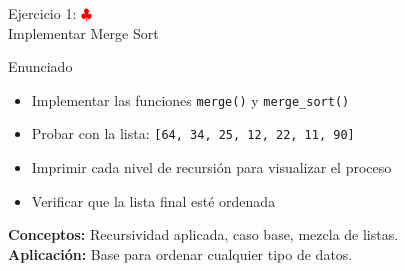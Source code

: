 \documentclass[10pt]{beamer}
\begin{document}
\begin{frame}{Ejercicio 1: \hfill \textcolor{red}{$\clubsuit$} \\ Implementar Merge Sort}
  \begin{block}{Enunciado}
    \begin{itemize}
      \item Implementar las funciones \texttt{merge()} y \texttt{merge\_sort()}
      \item Probar con la lista: \texttt{[64, 34, 25, 12, 22, 11, 90]}
      \item Imprimir cada nivel de recursión para visualizar el proceso
      \item Verificar que la lista final esté ordenada
    \end{itemize}
  \end{block}
  
  \textbf{Conceptos:} Recursividad aplicada, caso base, mezcla de listas.
  \\
  \textbf{Aplicación:} Base para ordenar cualquier tipo de datos.
\end{frame}
\end{document}
